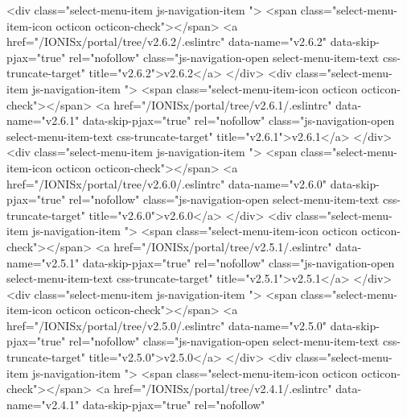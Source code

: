             <div class="select-menu-item js-navigation-item ">
              <span class="select-menu-item-icon octicon octicon-check"></span>
              <a href="/IONISx/portal/tree/v2.6.2/.eslintrc"
                 data-name="v2.6.2"
                 data-skip-pjax="true"
                 rel="nofollow"
                 class="js-navigation-open select-menu-item-text css-truncate-target"
                 title="v2.6.2">v2.6.2</a>
            </div>
            <div class="select-menu-item js-navigation-item ">
              <span class="select-menu-item-icon octicon octicon-check"></span>
              <a href="/IONISx/portal/tree/v2.6.1/.eslintrc"
                 data-name="v2.6.1"
                 data-skip-pjax="true"
                 rel="nofollow"
                 class="js-navigation-open select-menu-item-text css-truncate-target"
                 title="v2.6.1">v2.6.1</a>
            </div>
            <div class="select-menu-item js-navigation-item ">
              <span class="select-menu-item-icon octicon octicon-check"></span>
              <a href="/IONISx/portal/tree/v2.6.0/.eslintrc"
                 data-name="v2.6.0"
                 data-skip-pjax="true"
                 rel="nofollow"
                 class="js-navigation-open select-menu-item-text css-truncate-target"
                 title="v2.6.0">v2.6.0</a>
            </div>
            <div class="select-menu-item js-navigation-item ">
              <span class="select-menu-item-icon octicon octicon-check"></span>
              <a href="/IONISx/portal/tree/v2.5.1/.eslintrc"
                 data-name="v2.5.1"
                 data-skip-pjax="true"
                 rel="nofollow"
                 class="js-navigation-open select-menu-item-text css-truncate-target"
                 title="v2.5.1">v2.5.1</a>
            </div>
            <div class="select-menu-item js-navigation-item ">
              <span class="select-menu-item-icon octicon octicon-check"></span>
              <a href="/IONISx/portal/tree/v2.5.0/.eslintrc"
                 data-name="v2.5.0"
                 data-skip-pjax="true"
                 rel="nofollow"
                 class="js-navigation-open select-menu-item-text css-truncate-target"
                 title="v2.5.0">v2.5.0</a>
            </div>
            <div class="select-menu-item js-navigation-item ">
              <span class="select-menu-item-icon octicon octicon-check"></span>
              <a href="/IONISx/portal/tree/v2.4.1/.eslintrc"
                 data-name="v2.4.1"
                 data-skip-pjax="true"
                 rel="nofollow"
